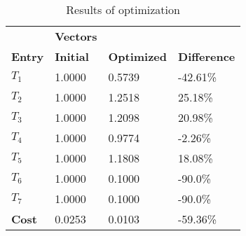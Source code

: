 \begin{table}[H]
\centering
\begin{tabular}{llll}
\textbf{}      & \cellcolor[HTML]{EFEFEF}\textbf{Vectors} & \textbf{} & \textbf{}         \\
\rowcolor[HTML]{EFEFEF} 
\textbf{Entry} & \textbf{Initial} & \textbf{Optimized} & \textbf{Difference} \\
$T_1$ & 1.0000 & 0.5739 & -42.61\% \\ 
$T_2$ & 1.0000 & 1.2518 & 25.18\% \\ 
$T_3$ & 1.0000 & 1.2098 & 20.98\% \\ 
$T_4$ & 1.0000 & 0.9774 & -2.26\% \\ 
$T_5$ & 1.0000 & 1.1808 & 18.08\% \\ 
$T_6$ & 1.0000 & 0.1000 & -90.0\% \\ 
$T_7$ & 1.0000 & 0.1000 & -90.0\% \\ 
\rowcolor[HTML]{EFEFEF} 
\textbf{Cost}  & 0.0253 & 0.0103 & -59.36\% \\ 
\end{tabular}
\caption{Results of optimization}
\label{tab:OptimizationAnalysis}
\end{table}